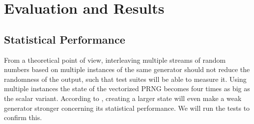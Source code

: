 \documentclass{stdlocal}
\begin{document}
\section{Evaluation and Results} %
\label{sec:evaluation}
  \autocite{compiler-explorer,intel-intrinsics-guide,perfevent,vandevoorde2018,meyers2014}

  \subsection{Statistical Performance} %
  \label{sub:statistical_performance}
    From a theoretical point of view, interleaving multiple streams of random numbers based on multiple instances of the same generator should not reduce the randomness of the output, such that test suites will be able to measure it.
    Using multiple instances the state of the vectorized PRNG becomes four times as big as the scalar variant.
    According to \textcite{oneill-blog-toobig}, creating a larger state will even make a weak generator stronger concerning its statistical performance.
    We will run the tests to confirm this.
\end{document}
